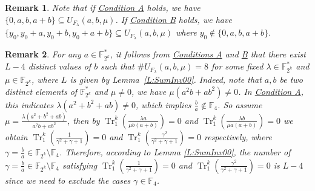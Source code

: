 \documentclass{article}
\newcommand{\F}{\mathbb{F}}
\newcommand{\0}{\textbf{0}}
\newcommand{\1}{\textbf{1}}
\newcommand{\TRACE}{\operatorname{Tr}_1^k}
\theoremstyle{plain}
\newtheorem{remark}{Remark}
\begin{document}
    \begin{remark}
        Note that if \hyperref[item_a]{\textsf{Condition A}} holds, we have $\{0,a,b,a+b\}\subseteq U_{F_{\lambda} }(a,b,\mu)$.
        If \hyperref[item_b]{\textsf{Condition B}} holds, we have $\{y_0,y_0+a,y_0+b,y_0+a+b\}\subseteq U_{F_{\lambda}}(a,b,\mu)$ where $y_0\notin\{0,a,b,a+b\}$.
    \end{remark}
    \begin{remark}
        For any $a\in\F_{2^k}^*$, it follows from \hyperref[item_a]{\textsf{Conditions A}} and \hyperref[item_b]{\textsf{B}} that there exist $L-4$ distinct values of $b$
        such that $\#U_{F_{\lambda}}(a,b,\mu)=8$ for some fixed $\lambda\in\F_{2^k}^*$ and $\mu\in\F_{2^k}$,
        where $L$ is given by Lemma~\ref{L:SumInv00}.
       Indeed, note that $a,b$ be two distinct elements of $\F_{2^k}^*$ and $\mu\ne 0$,
        we have $\mu(a^2b+ab^2)\ne 0$.
        In \hyperref[item_a]{\textsf{Condition A}}, this indicates $\lambda(a^2+b^2+ab)\ne 0$,
        which implies $\frac{b}{a}\notin\F_4$.
        So assume $\mu=\frac{\lambda(a^2+b^2+ab)}{a^2b+ab^2}$,
        then by  $\TRACE\left(\frac{\lambda a}{\mu b(a+b)}\right)=0$
        and $\TRACE\left(\frac{\lambda b}{\mu a(a+b)}\right)=0$
        we obtain $\TRACE\left(\frac{1}{\gamma^2+\gamma+1}\right)=0$ and $\TRACE\left(\frac{\gamma^2}{\gamma^2+\gamma+1}\right)=0$ respectively,
        where $\gamma=\frac{b}{a}\in\F_{2^k}\setminus\F_{4}$.
        Therefore, according to Lemma \ref{L:SumInv00},
        the number of $\gamma=\frac{b}{a}\in\F_{2^k}\setminus\F_{4}$ satisfying
        $\TRACE\left(\frac{1}{\gamma^2+\gamma+1}\right)=0$ and $\TRACE\left(\frac{\gamma^2}{\gamma^2+\gamma+1}\right)=0$
        is $L-4$ since we need to exclude the cases $\gamma\in\F_4$.
    \end{remark}
\end{document}
